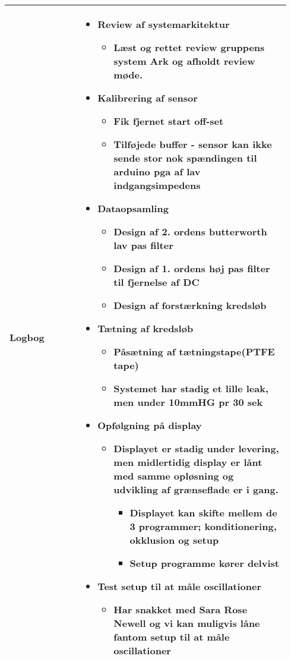 \begin{longtable}{|p{0.24\linewidth}|p{0.7\linewidth}|}
		\\ \hline
		Logbog & 
		\begin{itemize}
			\item Review af systemarkitektur 
			\begin{itemize}
				\item Læst og rettet review gruppens system Ark og afholdt review møde. 
			\end{itemize}
			\item Kalibrering af sensor
			\begin{itemize}
				\item Fik fjernet start off-set
				\item Tilføjede buffer - sensor kan ikke sende stor nok spændingen til arduino pga af lav indgangsimpedens 
			\end{itemize}
			\item Dataopsamling 
			\begin{itemize}
				\item Design af 2. ordens butterworth lav pas filter
				\item Design af 1. ordens høj pas filter til fjernelse af DC
				\item Design af forstærkning kredsløb
			\end{itemize}
			\item Tætning af kredsløb
			\begin{itemize}
				\item Påsætning af tætningstape(PTFE tape)
				\item Systemet har stadig et lille leak, men under 10mmHG pr 30 sek
			\end{itemize}
			\item Opfølgning på display 
			\begin{itemize}
				\item Displayet er stadig under levering, men midlertidig display er lånt med samme opløsning og udvikling af grænseflade er i gang. 
				\begin{itemize}
					\item Displayet kan skifte mellem de 3 programmer; konditionering, okklusion og setup
					\item Setup programme kører delvist
				\end{itemize}
			\end{itemize}
			\item Test setup til at måle oscillationer 
			\begin{itemize}
				\item Har snakket med Sara Rose Newell og vi kan muligvis låne fantom setup til at måle oscillationer
			\end{itemize}
		\end{itemize}
		\\ \hline
	\end{longtable}
	
